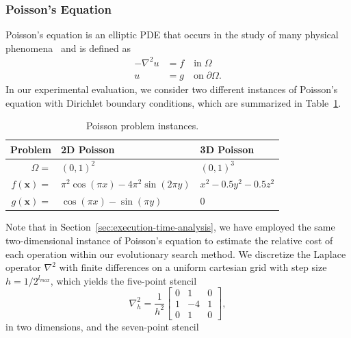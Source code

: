 \subsubsection{Poisson's Equation}
\label{sec:poisson-equation}
Poisson's equation is an elliptic PDE that occurs in the study of many physical phenomena~\cite{folland2020introduction} and is defined as
\begin{equation}
	\begin{split}
		-\nabla^{2} u & = f \quad \text{in} \; \Omega \\
		u & = g \quad \text{on} \; \partial \Omega.
	\end{split}
	\label{eq:poisson}
\end{equation}
In our experimental evaluation, we consider two different instances of Poisson's equation with Dirichlet boundary conditions, which are summarized in Table~\ref{table:poisson-problems}.
\begin{table}
	\begin{tabular}{r l l}
		\toprule
		Problem & 2D Poisson & 3D Poisson \\
		\midrule
		$\Omega = $ & $ (0, 1)^2$ & $(0, 1)^3$ \\
		\midrule
		$f(\bm{x}) = $ & $\pi^2 \cos(\pi x) - 4 \pi^2 \sin(2 \pi y)$ & $x^2 - 0.5 y^2 - 0.5 z^2$ \\
		\midrule
		$g(\bm{x}) = $ & $\cos(\pi x) - \sin(\pi y)$ & $0$ \\
		\bottomrule
	\end{tabular}
	\caption{Poisson problem instances.}
	\label{table:poisson-problems}
\end{table}
Note that in Section~\ref{sec:execution-time-analysis}, we have employed the same two-dimensional instance of Poisson's equation to estimate the relative cost of each operation within our evolutionary search method.
We discretize the Laplace operator $\nabla^{2}$ with finite differences on a uniform cartesian grid with step size $h = 1/2^{l_{max}}$, which yields the five-point stencil
\begin{equation*}
	\nabla^2_h = 
	\frac{1}{h^2} \begin{bmatrix}
		0 & 1 & 0\\
		1 & -4 & 1 \\
		0 & 1 & 0  
	\end{bmatrix},
\end{equation*}
in two dimensions, and the seven-point stencil
